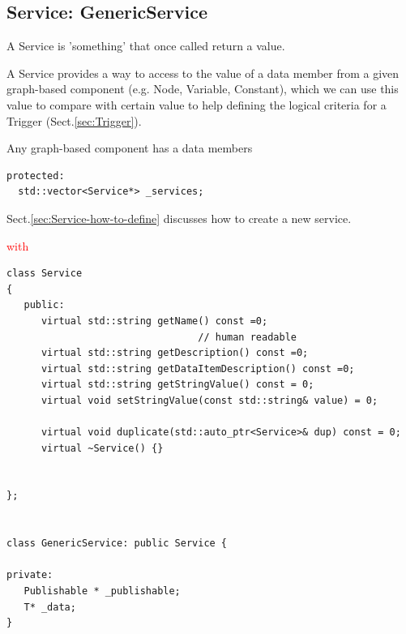 \subsection{Service: GenericService}
\label{sec:Service}

A Service is 'something' that once called return a value.

A Service provides a way to access to the value of a data member from a given
graph-based component (e.g. Node, Variable, Constant), which we can use this
value to compare with certain value to help defining the logical criteria for a
Trigger (Sect.\ref{sec:Trigger}).

Any graph-based component has a data members
\begin{verbatim}
protected:
  std::vector<Service*> _services;
\end{verbatim}
Sect.\ref{sec:Service-how-to-define} discusses how to create a new service.

\textcolor{red}{with}
\begin{lstlisting}
class Service
{
   public:
      virtual std::string getName() const =0;
                                 // human readable
      virtual std::string getDescription() const =0;
      virtual std::string getDataItemDescription() const =0;
      virtual std::string getStringValue() const = 0;      
      virtual void setStringValue(const std::string& value) = 0;      

      virtual void duplicate(std::auto_ptr<Service>& dup) const = 0;
      virtual ~Service() {}


};


class GenericService: public Service {

private:
   Publishable * _publishable;
   T* _data;
}
\end{lstlisting}


